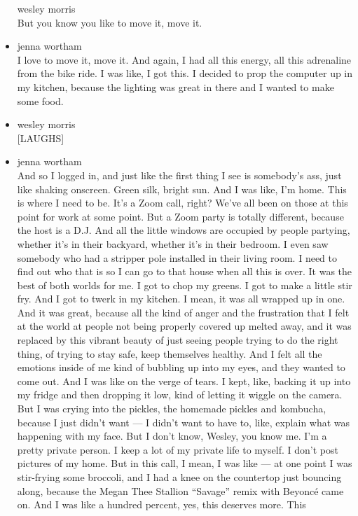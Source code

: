 \begin{itemize}
  wesley morris\\
  But you know you like to move it, move it.
\item
  jenna wortham\\
  I love to move it, move it. And again, I had all this energy, all this
  adrenaline from the bike ride. I was like, I got this. I decided to
  prop the computer up in my kitchen, because the lighting was great in
  there and I wanted to make some food.
\item
  wesley morris\\
  {[}LAUGHS{]}
\item
  jenna wortham\\
  And so I logged in, and just like the first thing I see is somebody's
  ass, just like shaking onscreen. Green silk, bright sun. And I was
  like, I'm home. This is where I need to be. It's a Zoom call, right?
  We've all been on those at this point for work at some point. But a
  Zoom party is totally different, because the host is a D.J. And all
  the little windows are occupied by people partying, whether it's in
  their backyard, whether it's in their bedroom. I even saw somebody who
  had a stripper pole installed in their living room. I need to find out
  who that is so I can go to that house when all this is over. It was
  the best of both worlds for me. I got to chop my greens. I got to make
  a little stir fry. And I got to twerk in my kitchen. I mean, it was
  all wrapped up in one. And it was great, because all the kind of anger
  and the frustration that I felt at the world at people not being
  properly covered up melted away, and it was replaced by this vibrant
  beauty of just seeing people trying to do the right thing, of trying
  to stay safe, keep themselves healthy. And I felt all the emotions
  inside of me kind of bubbling up into my eyes, and they wanted to come
  out. And I was like on the verge of tears. I kept, like, backing it up
  into my fridge and then dropping it low, kind of letting it wiggle on
  the camera. But I was crying into the pickles, the homemade pickles
  and kombucha, because I just didn't want --- I didn't want to have to,
  like, explain what was happening with my face. But I don't know,
  Wesley, you know me. I'm a pretty private person. I keep a lot of my
  private life to myself. I don't post pictures of my home. But in this
  call, I mean, I was like --- at one point I was stir-frying some
  broccoli, and I had a knee on the countertop just bouncing along,
  because the Megan Thee Stallion ``Savage'' remix with Beyoncé came on.
  And I was like a hundred percent, yes, this deserves more. This

\end{itemize}
